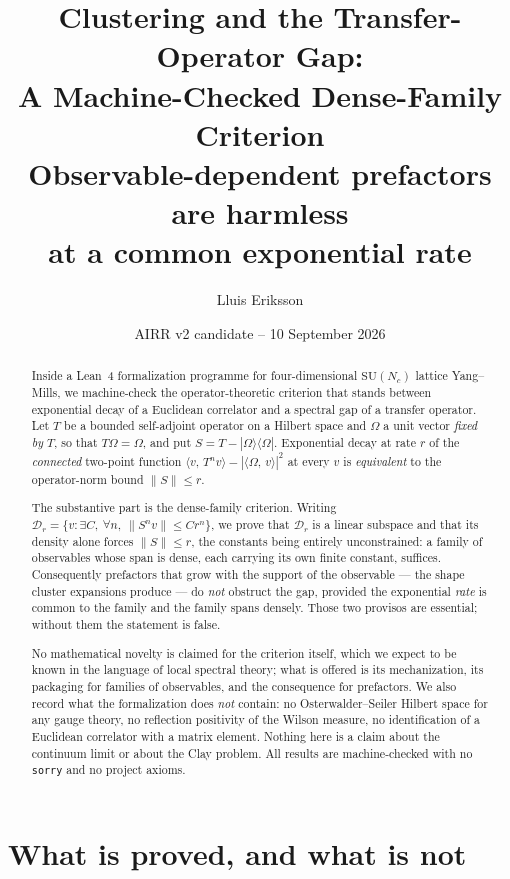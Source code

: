 \documentclass[11pt]{article}
\title{Clustering and the Transfer-Operator Gap:\\
A Machine-Checked Dense-Family Criterion\\
\large Observable-dependent prefactors are harmless\\
at a common exponential rate}
\author{Lluis Eriksson}
\date{AIRR v2 candidate -- 10 September 2026}
\theoremstyle{definition}
\newcommand{\lean}[1]{\texttt{#1}}
\newcommand{\SU}{\mathrm{SU}}
\newcommand{\Om}{\Omega}
\newcommand{\inn}[2]{\langle #1,\, #2\rangle}
\newcommand{\ket}[1]{|#1\rangle}
\newcommand{\bra}[1]{\langle #1|}
\begin{document}
\maketitle

\begin{abstract}
Inside a Lean~4 formalization programme for four-dimensional $\SU(N_c)$
lattice Yang--Mills, we machine-check the operator-theoretic criterion
that stands between exponential decay of a Euclidean correlator and a
spectral gap of a transfer operator.  Let $T$ be a bounded self-adjoint
operator on a Hilbert space and $\Om$ a unit vector \emph{fixed by} $T$,
so that $T\Om = \Om$, and put $S = T - \ket{\Om}\bra{\Om}$.  Exponential
decay at rate $r$ of the \emph{connected} two-point function
$\inn{v}{T^n v} - |\inn{\Om}{v}|^2$ at every $v$ is \emph{equivalent} to
the operator-norm bound $\|S\| \le r$.

The substantive part is the dense-family criterion.  Writing
$\mathcal{D}_r = \{v : \exists C,\ \forall n,\ \|S^n v\| \le C r^n\}$, we
prove that $\mathcal{D}_r$ is a linear subspace and that its density
alone forces $\|S\| \le r$, the constants being entirely unconstrained:
a family of observables whose span is dense, each carrying its own finite
constant, suffices.  Consequently prefactors that grow with the support
of the observable --- the shape cluster expansions produce --- do
\emph{not} obstruct the gap, provided the exponential \emph{rate} is
common to the family and the family spans densely.  Those two provisos
are essential; without them the statement is false.

No mathematical novelty is claimed for the criterion itself, which we
expect to be known in the language of local spectral theory; what is
offered is its mechanization, its packaging for families of observables,
and the consequence for prefactors.  We also record what the
formalization does \emph{not} contain: no Osterwalder--Seiler Hilbert
space for any gauge theory, no reflection positivity of the Wilson
measure, no identification of a Euclidean correlator with a matrix
element.  Nothing here is a claim about the continuum limit or about the
Clay problem.  All results are machine-checked with no \lean{sorry} and
no project axioms.
\end{abstract}

\section{What is proved, and what is not}
\end{document}

